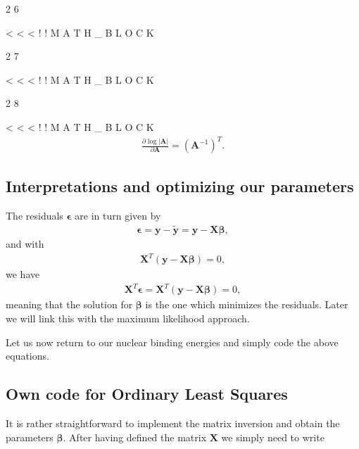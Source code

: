 \documentclass[letterpaper,10pt,english]{sphinxmanual}
\begin{document}
2
6

\textless{}
\textless{}
\textless{}
!
!
M
A
T
H
\_
B
L
O
C
K

2
7

\textless{}
\textless{}
\textless{}
!
!
M
A
T
H
\_
B
L
O
C
K

2
8

\textless{}
\textless{}
\textless{}
!
!
M
A
T
H
\_
B
L
O
C
K
\begin{equation*}
\begin{split}
\frac{\partial \log{\vert\boldsymbol{A}\vert}}{\partial \boldsymbol{A}} = (\boldsymbol{A}^{-1})^T.
\end{split}
\end{equation*}

\subsection{Interpretations and optimizing our parameters}
\label{\detokenize{chapter4:id3}}
The residuals \(\boldsymbol{\epsilon}\) are in turn given by
\begin{equation*}
\begin{split}
\boldsymbol{\epsilon} = \boldsymbol{y}-\boldsymbol{\tilde{y}} = \boldsymbol{y}-\boldsymbol{X}\boldsymbol{\beta},
\end{split}
\end{equation*}
and with
\begin{equation*}
\begin{split}
\boldsymbol{X}^T\left( \boldsymbol{y}-\boldsymbol{X}\boldsymbol{\beta}\right)= 0,
\end{split}
\end{equation*}
we have
\begin{equation*}
\begin{split}
\boldsymbol{X}^T\boldsymbol{\epsilon}=\boldsymbol{X}^T\left( \boldsymbol{y}-\boldsymbol{X}\boldsymbol{\beta}\right)= 0,
\end{split}
\end{equation*}
meaning that the solution for \(\boldsymbol{\beta}\) is the one which minimizes the residuals.  Later we will link this with the maximum likelihood approach.

Let us now return to our nuclear binding energies and simply code the above equations.


\subsection{Own code for Ordinary Least Squares}
\label{\detokenize{chapter4:own-code-for-ordinary-least-squares}}
It is rather straightforward to implement the matrix inversion and obtain the parameters \(\boldsymbol{\beta}\). After having defined the matrix \(\boldsymbol{X}\) we simply need to
write
\end{document}
